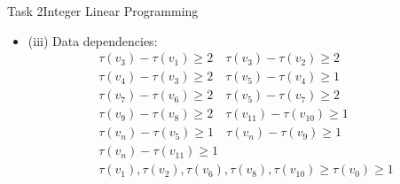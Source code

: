 \begin{frame}[allowframebreaks]{Task 2}{Integer Linear Programming}
\begin{solutionnoinc}
    \begin{itemize}
      \item \alert{(iii) Data dependencies:}
        \[
        \begin{aligned}
        & \tau\left(v_3\right)-\tau\left(v_1\right) \geq 2 \quad \tau\left(v_3\right)-\tau\left(v_2\right) \geq 2 \\
        & \tau\left(v_4\right)-\tau\left(v_3\right) \geq 2 \quad \tau\left(v_5\right)-\tau\left(v_4\right) \geq 1 \\
        & \tau\left(v_7\right)-\tau\left(v_6\right) \geq 2 \quad \tau\left(v_5\right)-\tau\left(v_7\right) \geq 2 \\
        & \tau\left(v_9\right)-\tau\left(v_8\right) \geq 2 \quad \tau\left(v_{11}\right)-\tau\left(v_{10}\right) \geq 1 \\
        & \tau\left(v_n\right)-\tau\left(v_5\right) \geq 1 \quad \tau\left(v_n\right)-\tau\left(v_9\right) \geq 1 \\
        & \tau\left(v_n\right)-\tau\left(v_{11}\right) \geq 1 \\
        & \tau\left(v_1\right), \tau\left(v_2\right), \tau\left(v_6\right), \tau\left(v_8\right), \tau\left(v_{10}\right) \geq \tau\left(v_0\right) \geq 1 \\
        &
        \end{aligned}
        \]
    \end{itemize}
  \end{solutionnoinc}

\end{frame}
